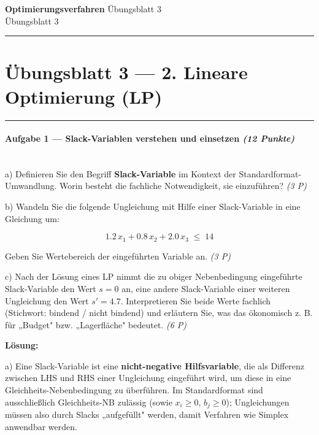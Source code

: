 \documentclass[11pt, a4paper]{article}
\providecommand{\nichttitle}{Übungsblatt}
\providecommand{\nichtsubtitle}{}
\renewcommand{\nichttitle}{Optimierungsverfahren}
\renewcommand{\nichtsubtitle}{Übungsblatt 3}
\begin{document}
\begin{center}
{\Large\bfseries\color{accent}\nichttitle}
\ifx\nichtsubtitle\empty\else
  \\[2pt]{\normalsize\color{accent!80!black}\nichtsubtitle}
\fi
\\[2pt]
\color{accent}\rule{0.4\linewidth}{0.8pt}\color{black}
\end{center}
\vspace{4pt}


\section{Übungsblatt 3 — 2. Lineare Optimierung (LP)}


\noindent\textcolor{rulegray}{\rule{\linewidth}{0.4pt}}


\paragraph{Aufgabe 1 — Slack-Variablen verstehen und einsetzen \textit{(12 Punkte)}}\mbox{}\\[2pt]

a) Definieren Sie den Begriff \textbf{Slack-Variable} im Kontext der Standardformat-Umwandlung. Worin besteht die fachliche Notwendigkeit, sie einzuführen? \textit{(3 P)}


b) Wandeln Sie die folgende Ungleichung mit Hilfe einer Slack-Variable in eine Gleichung um:


\[
1.2\,x_1 + 0.8\,x_2 + 2.0\,x_3 \;\leq\; 14
\]


Geben Sie Wertebereich der eingeführten Variable an. \textit{(3 P)}


c) Nach der Lösung eines LP nimmt die zu obiger Nebenbedingung eingeführte Slack-Variable den Wert $s = 0$ an, eine andere Slack-Variable einer weiteren Ungleichung den Wert $s' = 4.7$. Interpretieren Sie beide Werte fachlich (Stichwort: bindend / nicht bindend) und erläutern Sie, was das ökonomisch z. B. für „Budget" bzw. „Lagerfläche" bedeutet. \textit{(6 P)}


\textbf{Lösung:}


a) Eine Slack-Variable ist eine \textbf{nicht-negative Hilfsvariable}, die als Differenz zwischen LHS und RHS einer Ungleichung eingeführt wird, um diese in eine Gleichheits-Nebenbedingung zu überführen. Im Standardformat sind ausschließlich Gleichheits-NB zulässig (sowie $x_i \geq 0$, $b_j \geq 0$); Ungleichungen müssen also durch Slacks „aufgefüllt" werden, damit Verfahren wie Simplex anwendbar werden.
\end{document}
